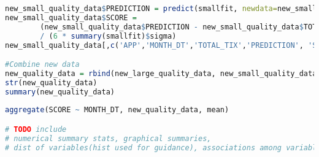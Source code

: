 \documentclass[SDSUThesis.tex]{subfiles}
\begin{document}
{\begin{lstlisting}[language=R]
new_small_quality_data$PREDICTION = predict(smallfit, newdata=new_small_quality_data)
new_small_quality_data$SCORE = 
        (new_small_quality_data$PREDICTION - new_small_quality_data$TOTAL_TIX)
        / (6 * summary(smallfit)$sigma)
new_small_quality_data[,c('APP','MONTH_DT','TOTAL_TIX','PREDICTION', 'SCORE')]

#Combine new data  
new_quality_data = rbind(new_large_quality_data, new_small_quality_data)
str(new_quality_data)
summary(new_quality_data)
  
aggregate(SCORE ~ MONTH_DT, new_quality_data, mean)

# TODO include
# numerical summary stats, graphical summaries,
# dist of variables(hist used for guidance), associations among variables
\end{lstlisting}}

\subsection{}
\end{document}
